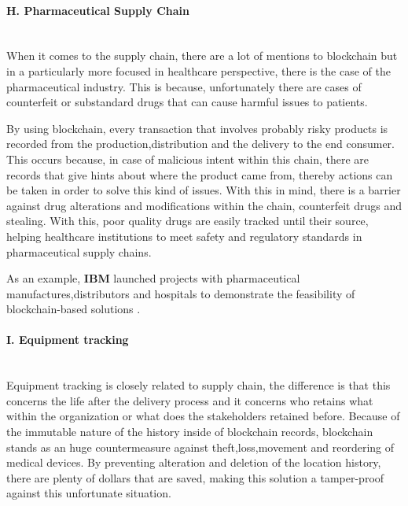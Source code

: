 \paragraph{H. Pharmaceutical Supply Chain} \mbox{}\\
When it comes to the supply chain, there are a lot of mentions to blockchain but in a particularly more focused in 
healthcare perspective, there is the case of the pharmaceutical industry. This is because, unfortunately there are cases of counterfeit 
or substandard drugs that can cause harmful issues to patients.

By using blockchain, every transaction that involves probably risky products is recorded from the production,distribution 
and the delivery to the end consumer. This occurs because, in case of malicious intent within this chain, there are records that 
give hints about where the product came from, thereby actions can be taken in order to solve this kind of issues. With this in mind, 
there is a barrier against drug alterations and modifications within the chain, counterfeit drugs and stealing. With this, poor quality 
drugs are easily tracked until their source, helping healthcare institutions to meet safety and regulatory standards in pharmaceutical 
supply chains.

As an example, \textbf{IBM} launched projects with pharmaceutical manufactures,distributors and hospitals to demonstrate the feasibility 
of blockchain-based solutions \cite{blockchain-implementation-review-conceptual}. 

\paragraph{I. Equipment tracking}  \mbox{}\\
Equipment tracking is closely related to supply chain, the difference is that this concerns the life after the delivery process and 
it concerns who retains what within the organization or what does the stakeholders retained before. Because of the immutable nature of 
the history inside of blockchain records, blockchain stands as an huge countermeasure against theft,loss,movement and reordering of medical 
devices. By preventing alteration and deletion of the location history, there are plenty of dollars that are saved, making this solution a 
tamper-proof against this unfortunate situation.

